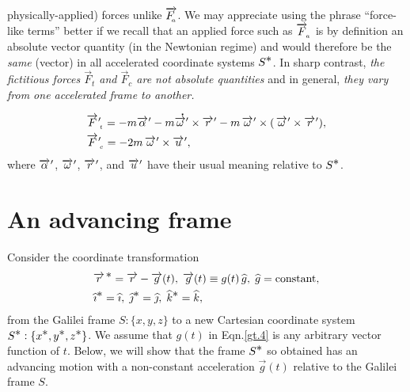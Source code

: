 physically-applied) forces unlike $\vec{F_{\sfx{a}}}$. 
We may appreciate using the phrase ``force-like terms'' 
 better if we recall that an applied force such as 
$\vec{F}_{\sfx{a}}$ is by definition an absolute vector 
quantity (in the Newtonian regime) and would therefore 
be the \textsl{same} (vector) in all accelerated 
coordinate systems $S^\bst$. In sharp contrast, 
\textsl{the fictitious forces $\vec{F}_{t}$ and 
$\vec{F}_{c}$ are not absolute quantities} and in 
general, \textsl{they vary from one accelerated frame 
to another.} 
\begin{align*}
& \pvec{F}_{\sfx{t}}=-m\pvec{\alpha}
-m\dotup{\vec{\gkw}'} \times \pvec{r} -m
\,\pvec{\gkw}\times ( \,\pvec{\gkw}\times \pvec{r}),\\
& \pvec{F}_{\sfx{c}}  
=-2m\,\pvec{\gkw}\times\pvec{u},
\end{align*}
where $\pvec{\alpha}$, $\pvec{\gkw}$, $\pvec{r}$, and
$\pvec{u}$ have their usual meaning relative to $S^\bst$.
\section{An advancing frame}
Consider the coordinate transformation
\begin{align}\label{gt.4}
&\svec{r}= \vec{r}-\vec{g}(t),\;\vec{g}(t)\equiv
g(t)\,\hat{g},\;
\hat{g}=\text{constant},\notag \\
&\eye^\bst=\eye,\; \jay^\bst=\jay,\;\kay^\bst=\kay,
\end{align}
from the Galilei frame $S:\{x,y,z\}$ to a new Cartesian 
coordinate system $S^\bst:\{x^\bst,y^\bst,z^\bst\}$. We 
assume that $g(t)$ in Eqn.\eqref{gt.4} is any arbitrary 
vector function of $t$. Below, we will show that the frame 
$S^\bst$ so obtained has an advancing motion with a 
{non-constant} acceleration $\vec{g}(t)$ relative to the 
Galilei frame $S$.

